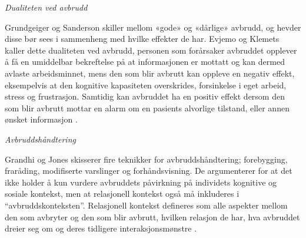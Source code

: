 \noindent
\emph{Dualiteten ved avbrudd}

\noindent
Grundgeiger og Sanderson skiller mellom «gode» og «dårlige» avbrudd, og hevder disse bør sees i sammenheng med hvilke effekter de har. Evjemo og Klemets kaller dette dualiteten ved avbrudd, personen som forårsaker avbruddet opplever å få en umiddelbar bekreftelse på at informasjonen er mottatt og kan dermed avlaste arbeidsminnet, mens den som blir avbrutt kan oppleve en negativ effekt, eksempelvis at den kognitive kapasiteten overskrides, forsinkelse i eget arbeid, stress og frustrasjon. Samtidig kan avbruddet ha en positiv effekt dersom den som blir avbrutt mottar en alarm om en pasients alvorlige tilstand, eller annen ønsket informasjon \cite{Evjemo, Grundgeiger09}. 

\noindent
\emph{Avbruddshåndtering}

\noindent
Grandhi og Jones skisserer fire teknikker for avbruddshåndtering; forebygging, fraråding, modifiserte varslinger og forhåndsvisning. De argumenterer for at det ikke holder å kun vurdere avbruddets påvirkning på individets kognitive og sosiale kontekst, men at relasjonell kontekst også må inkluderes i “avbruddskonteksten”. Relasjonell kontekst defineres som alle aspekter mellom den som avbryter og den som blir avbrutt, hvilken relasjon de har, hva avbruddet dreier seg om og deres tidligere interaksjonsmønstre \cite{Grandhi10}.
